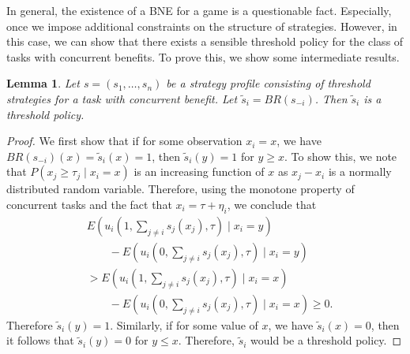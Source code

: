 \documentclass[conference]{ieeeconf}
\newtheorem{lemma}{Lemma}
\begin{document}
In general, the existence of a BNE for a game is a questionable fact. Especially, once we impose additional constraints on the structure of strategies. However, in this case, we can show that there exists a sensible threshold policy for the class of tasks with concurrent benefits. To prove this, we show some intermediate results. 
\begin{lemma}\label{lemma:thresholdBR}
Let $s=(s_1,\ldots,s_n)$ be a strategy profile consisting of threshold strategies for a task with concurrent benefit. Let $\tilde{s}_i=BR(s_{-i})$. Then $\tilde{s}_i$ is a threshold policy. 
\end{lemma}
\begin{proof}
We first show that if for some observation $x_i=x$, we have $BR(s_{-i})(x)=\tilde{s}_i(x)=1$, then $\tilde{s}_i(y)=1$ for $y\geq x$. To show this,  we note that $P(x_j\geq \tau_j\mid x_i=x)$ is an increasing function of $x$ as $x_j-x_i$ is a normally distributed random variable. Therefore, using the monotone property of concurrent tasks and the fact that $x_i=\tau+\eta_i$, we conclude that 
\begin{align*}
&E(u_i(1,\sum_{j\not=i}s_j(x_j),\tau)\mid x_i=y)\\ 
&\qquad-E(u_i(0,\sum_{j\not=i}s_j(x_j),\tau)\mid x_i=y)\\ 
&>E(u_i(1,\sum_{j\not=i}s_j(x_j),\tau)\mid x_i=x)\\
&\qquad-E(u_i(0,\sum_{j\not=i}s_j(x_j),\tau)\mid x_i=x)\geq 0.
\end{align*}
Therefore $\tilde{s}_i(y)=1$. Similarly, if for some value of $x$, we have $\tilde{s}_i(x)=0$, then it follows that $\tilde{s}_i(y)=0$ for $y\leq x$. Therefore, $\tilde{s}_i$ would be a threshold policy.  
\end{proof}
\end{document}
